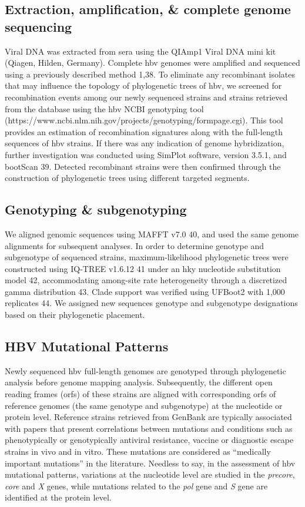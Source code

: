 \subsection{Extraction, amplification, \& complete genome sequencing}
Viral DNA was extracted from sera using the QIAmp1 Viral DNA mini kit (Qiagen, Hilden, Germany).
Complete \gls{hbv} genomes were amplified and sequenced using a previously described method 1,38.
To eliminate any recombinant isolates that may influence the topology of phylogenetic trees of \gls{hbv}, we screened for recombination events among our newly sequenced strains and strains retrieved from the database using the \gls{hbv} NCBI genotyping tool (https://www.ncbi.nlm.nih.gov/projects/genotyping/formpage.cgi).
This tool provides an estimation of recombination signatures along with the full-length sequences of \gls{hbv} strains.
If there was any indication of genome hybridization, further investigation was conducted using SimPlot software, version 3.5.1, and bootScan 39.
Detected recombinant strains were then confirmed through the construction of phylogenetic trees using different targeted segments.

\subsection{Genotyping \& subgenotyping}
We aligned genomic sequences using MAFFT v7.0 40, and used the same genome alignments for subsequent analyses.
In order to determine genotype and subgenotype of sequenced strains, maximum-likelihood phylogenetic trees were constructed using IQ-TREE v1.6.12 41 under an \gls{hky} nucleotide substitution model 42, accommodating among-site rate heterogeneity through a discretized gamma distribution 43.
Clade support was verified using UFBoot2 with 1,000 replicates 44.
We assigned new sequences genotype and subgenotype designations based on their phylogenetic placement.

\subsection{HBV Mutational Patterns}
Newly sequenced \gls{hbv} full-length genomes are genotyped through phylogenetic analysis before genome mapping analysis.
Subsequently, the different open reading frames (\gls{orf}s) of these strains are aligned with corresponding \gls{orf}s of reference genomes (the same genotype and subgenotype) at the nucleotide or protein level.
Reference strains retrieved from GenBank are typically associated with papers that present correlations between mutations and conditions such as phenotypically or genotypically antiviral resistance, vaccine or diagnostic escape strains in vivo and in vitro.
These mutations are considered as ``medically important mutations'' in the literature.
Needless to say, in the assessment of \gls{hbv} mutational patterns, variations at the nucleotide level are studied in the \textit{precore}, \textit{core} and \textit{X} genes, while mutations related to the \textit{pol} gene and \textit{S} gene are identified at the protein level.

